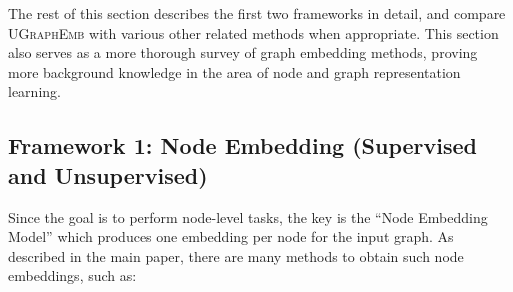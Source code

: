 \documentclass{article}
\newcommand{\model}{\textsc{UGraphEmb}\xspace}
\begin{document}
The rest of this section describes the first two frameworks in detail, and compare \model with various other related methods when appropriate. This section also serves as a more thorough survey of graph embedding methods, proving more background knowledge in the area of node and graph representation learning. 

\subsection{Framework 1: Node Embedding (Supervised and Unsupervised)}
\label{subsec-framework-1}

Since the goal is to perform node-level tasks, the key is the ``Node Embedding Model'' which produces one embedding per node for the input graph. As described in the main paper, there are many methods to obtain such node embeddings, such as:
\end{document}
